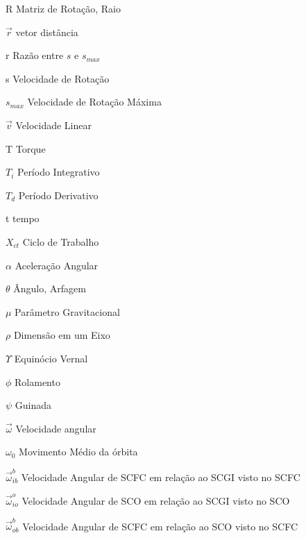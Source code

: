 \documentclass[
	12pt,					%
	openright,				%
	twoside,					%
	a4paper,					%
	english,					%
	brazil					%
	]{abntex2}
\numberwithin{equation}{subsection}
\begin{document}
\begin{simbolos}
    \item[R] Matriz de Rotação, Raio
    \item[$\vec{r}$] vetor distância
    \item[r] Razão entre $s$ e $s_{max}$ 
    \item[s] Velocidade de Rotação
    \item[$s_{max}$] Velocidade de Rotação Máxima
    \item[$\vec{v}$] Velocidade Linear
    \item[T] Torque
    \item[$T_i$] Período Integrativo
    \item[$T_d$] Período Derivativo
    \item[t] tempo
    \item[$X_{ct}$] Ciclo de Trabalho   
    \item[$\alpha$] Aceleração Angular
    \item[$\theta$] Ângulo, Arfagem
    \item[$\mu$] Parâmetro Gravitacional
    \item[$\rho$] Dimensão em um Eixo
    \item[$\Upsilon$] Equinócio Vernal
    \item[$\phi$] Rolamento
    \item[$\psi$] Guinada
    \item[$\vec{\omega}$] Velocidade angular
    \item[$\omega_0$] Movimento Médio da órbita
    \item[$\vec{\omega}^b_{ib}$] Velocidade Angular de SCFC em relação ao SCGI visto no SCFC
    \item[$\vec{\omega}^o_{io}$] Velocidade Angular de SCO em relação ao SCGI visto no SCO
    \item[$\vec{\omega}^b_{ob}$] Velocidade Angular de SCFC em relação ao SCO visto no SCFC
\end{simbolos}


\tableofcontents*
\cleardoublepage

\textual
\setcounter{page}{1}


\end{document}
